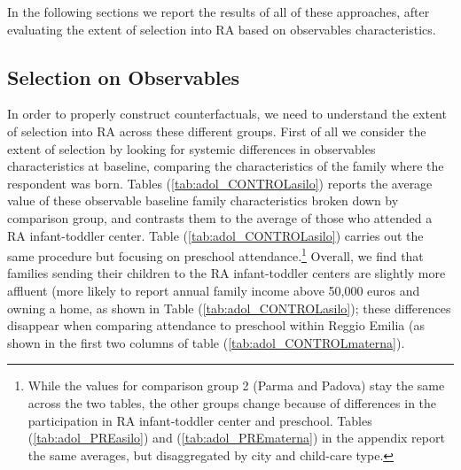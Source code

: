 \documentclass[12pt]{article}
\begin{document}
\bigskip 

In the following sections we report the results of all of these approaches, after evaluating the extent of selection into RA based on observables characteristics. 

\subsection{Selection on Observables}
\label{sec:selection}

In order to properly construct counterfactuals, we need to understand the extent of selection into RA across these different groups. First of all we consider the extent of selection by looking for systemic differences in observables characteristics at baseline, comparing the characteristics of the family where the respondent was born. Tables (\ref{tab:adol_CONTROLasilo}) reports the average value of these observable baseline family characteristics broken down by comparison group, and contrasts them to the average of those who attended a RA infant-toddler center. Table (\ref{tab:adol_CONTROLasilo}) carries out the same procedure but focusing on preschool attendance.\footnote{While the values for comparison group 2 (Parma and Padova) stay the same across the two tables, the other groups change because of differences in the participation in RA infant-toddler center and preschool. Tables (\ref{tab:adol_PREasilo}) and (\ref{tab:adol_PREmaterna}) in the appendix report the same averages, but disaggregated by city and child-care type.} 
Overall, we find that families sending their children to the RA infant-toddler centers are slightly more affluent (more likely to report annual family income above 50,000 euros and owning a home, as shown in Table (\ref{tab:adol_CONTROLasilo}); these differences disappear when comparing attendance to preschool within Reggio Emilia (as shown in the first two columns of table (\ref{tab:adol_CONTROLmaterna}). 

\singlespacing








\end{document}
